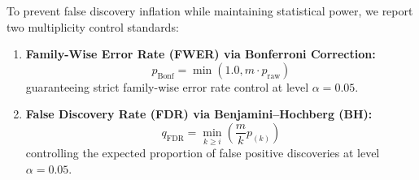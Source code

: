 \documentclass[10pt,twocolumn,letterpaper]{article}
\begin{document}
To prevent false discovery inflation while maintaining statistical power, we report two multiplicity control standards:
\begin{enumerate}
    \item \textbf{Family-Wise Error Rate (FWER) via Bonferroni Correction:}
    \begin{equation}
        p_{\mathrm{Bonf}} = \min(1.0, m \cdot p_{\mathrm{raw}})
    \end{equation}
    guaranteeing strict family-wise error rate control at level $\alpha = 0.05$.
    \item \textbf{False Discovery Rate (FDR) via Benjamini--Hochberg (BH):}
    \begin{equation}
        q_{\mathrm{FDR}} = \min_{k \ge i} \left(\frac{m}{k} p_{(k)}\right)
    \end{equation}
    controlling the expected proportion of false positive discoveries at level $\alpha = 0.05$.
\end{enumerate}
\end{document}
